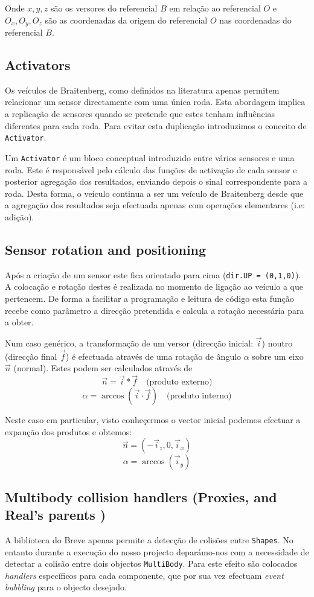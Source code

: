 \documentclass[a4paper]{article}
\begin{document}
Onde $x, y, z$ são os versores do referencial $B$ em relação ao referencial $O$ e $O_{x}, O_{y}, O_{z}$ são as coordenadas da origem do referencial $O$ nas coordenadas do referencial $B$.

\cleardoublepage
\subsection{Activators}
\indent \indent Os veículos de Braitenberg, como definidos na literatura apenas permitem relacionar um sensor directamente com uma única roda.
Esta abordagem implica a replicação de sensores quando se pretende que estes tenham influências diferentes para cada roda.
Para evitar esta duplicação introduzimos o conceito de \texttt{Activator}. 

Um \texttt{Activator} é um bloco conceptual introduzido entre vários sensores e uma roda.
Este é responsável pelo cálculo das funções de activação de cada sensor e posterior agregação dos resultados, enviando depois o sinal correspondente para a roda. Desta forma, o veículo continua a ser um veículo de Braitenberg desde que a agregação dos resultados seja efectuada apenas com operações elementares (i.e: adição). 

\subsection{Sensor rotation and positioning}
\indent \indent Após a criação de um sensor este fica orientado para cima (\texttt{dir.UP = (0,1,0)}).
A colocação e rotação destes é realizada no momento de ligação ao veículo a que pertencem.
De forma a facilitar a programação e leitura de código esta função recebe como parâmetro a direcção pretendida e calcula a rotação necessária para a obter.

Num caso genérico, a transformação de um versor (direcção inicial: $\vec{i}$) noutro (direcção final $\vec{f}$) é efectuada através de uma rotação de ângulo $\alpha$ sobre um eixo $\vec{n}$ (normal).
Estes podem ser calculados através de
\[
	\vec{n} = \vec{i}\ast\vec{f} \quad \text{(produto externo)}
\]
\[	
	\alpha = \arccos{(\vec{i} \cdot \vec{f})} \quad \text{(produto interno)}
\]

Neste caso em particular, visto conheçermos o vector inicial podemos efectuar a expanção dos produtos e obtemos:
\[
	\vec{n} = (-\vec{i}_{z}, 0, \vec{i}_{x})
\]
\[	
	\alpha = \arccos{(\vec{i}_{y})}
\]

\subsection{Multibody collision handlers (Proxies, and Real's parents )}
\indent \indent A biblioteca do Breve apenas permite a detecção de colisões entre \texttt{Shapes}. 
No entanto durante a execução do nosso projecto deparámo-nos com a necessidade de detectar a colisão entre dois objectos \texttt{MultiBody}.
Para este efeito são colocados \emph{handlers} específicos para cada componente, que por sua vez efectuam \emph{event bubbling} para o objecto desejado.
\end{document}
